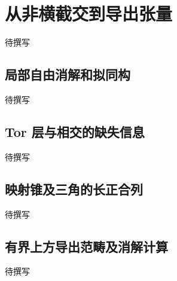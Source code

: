 
% 
% 

\section{从非横截交到导出张量}
\label{g5:sec:3101}

待撰写

\subsection{局部自由消解和拟同构}
\label{g5:subsec:3101:01}
待撰写

\subsection{Tor 层与相交的缺失信息}
\label{g5:subsec:3101:02}
待撰写

\subsection{映射锥及三角的长正合列}
\label{g5:subsec:3101:03}
待撰写

\subsection{有界上方导出范畴及消解计算}
\label{g5:subsec:3101:04}
待撰写
